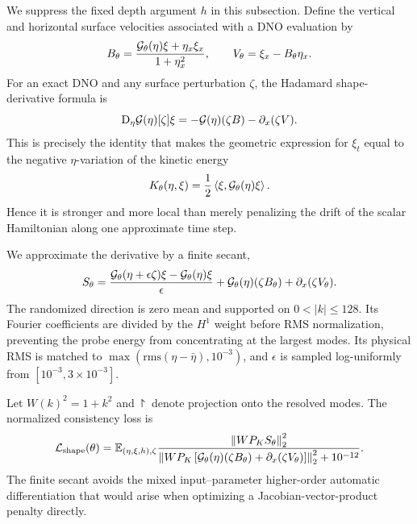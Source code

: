 We suppress the fixed depth argument $h$ in this subsection.
Define the vertical and horizontal surface velocities associated with a DNO
evaluation by
\begin{equation}
  B_\theta=
  \frac{\mathcal{G}_{\theta}(\eta)\xi+\eta_x\xi_x}{1+\eta_x^2},
  \qquad
  V_\theta=\xi_x-B_\theta\eta_x.
  \label{eq:BV}
\end{equation}
For an exact DNO and any surface perturbation $\zeta$, the Hadamard
shape-derivative formula is \cite[Theorem~3.20]{lannes2005}
\begin{equation}
  \mathrm{D}_\eta\mathcal{G}(\eta)[\zeta]\xi
  =-\mathcal{G}(\eta)(\zeta B)-\partial_x(\zeta V).
  \label{eq:hadamard}
\end{equation}
This is precisely the identity that makes the geometric expression for
$\xi_t$ equal to the negative $\eta$-variation of the kinetic energy
\begin{equation}
  K_\theta(\eta,\xi)=\frac12\left\langle \xi,\mathcal{G}_{\theta}(\eta)\xi\right\rangle.
  \label{eq:learned-kinetic}
\end{equation}
Hence it is stronger and more local than merely penalizing the drift of the
scalar Hamiltonian along one approximate time step.

We approximate the derivative by a finite secant,
\begin{equation}
  S_\theta=
  \frac{\mathcal{G}_{\theta}(\eta+\epsilon\zeta)\xi-
        \mathcal{G}_{\theta}(\eta)\xi}{\epsilon}
  +\mathcal{G}_{\theta}(\eta)(\zeta B_\theta)
  +\partial_x(\zeta V_\theta).
  \label{eq:hadamard-residual}
\end{equation}
The randomized direction is zero mean and supported on
$0<|k|\leq128$. Its Fourier coefficients are divided by the $H^1$ weight
before RMS normalization, preventing the probe energy from concentrating at
the largest modes. Its physical RMS is matched to
$\max(\mathrm{rms}(\eta-\bar\eta),10^{-3})$, and
$\epsilon$ is sampled log-uniformly from $[10^{-3},3\times10^{-3}]$.

Let $W(k)^2=1+k^2$ and $\project$ denote projection onto the resolved modes.
The normalized consistency loss is
\begin{equation}
  \mathcal L_{\mathrm{shape}}(\theta)
  =\mathbb E_{(\eta,\xi,h),\zeta}
  \frac{\left\lVert WP_K S_\theta\right\rVert_2^2}
  {\left\lVert WP_K\left[
      \mathcal{G}_{\theta}(\eta)(\zeta B_\theta)+
      \partial_x(\zeta V_\theta)\right]\right\rVert_2^2+10^{-12}}.
  \label{eq:shape-loss}
\end{equation}
The finite secant avoids the mixed input--parameter higher-order automatic
differentiation that would arise when optimizing a Jacobian-vector-product
penalty directly.

